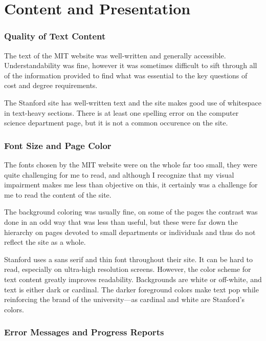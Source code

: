\section*{Content and Presentation}

\subsubsection*{Quality of Text Content}

The text of the MIT website was well-written and generally accessible. Understandability was
fine, however it was sometimes difficult to sift through all of the information provided to
find what was essential to the key questions of cost and degree requirements.

The Stanford site has well-written text and the site makes good use of whitespace
in text-heavy sections. There is at least one spelling error on the computer science
department page, but it is not a common occurence on the site.

\subsubsection*{Font Size and Page Color}

The fonts chosen by the MIT website were on the whole far too small, they were quite
challenging for me to read, and although I recognize that my visual impairment makes me less
than objective on this, it certainly was a challenge for me to read the content of the site.

The background coloring was usually fine, on some of the pages the contrast was done in an
odd way that was less than useful, but these were far down the hierarchy on pages devoted to
small departments or individuals and thus do not reflect the site as a whole.

Stanford uses a sans serif and thin font throughout their site. It can be hard to read,
especially on ultra-high resolution screens. However, the color scheme for text
content greatly improves readability. Backgrounds are white or off-white, and text
is either dark or cardinal. The darker foreground colors make text pop while
reinforcing the brand of the university---as cardinal and white are Stanford's colors.

\subsubsection*{Error Messages and Progress Reports}

